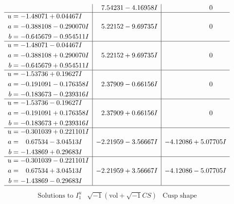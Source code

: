 \documentclass[1p]{elsarticle_modified}
\theoremstyle{definition}
\newcommand{\I}{\sqrt{-1}}
\begin{document}
$$\begin{array}{c|c|c}
 & \phantom{-}7.54231 - 4.16958 I & \phantom{-0.000000 } 0 \\ \hline\begin{aligned}
u &= -1.48071 + 0.04467 I \\
a &= -0.388108 - 0.290070 I \\
b &= -0.645679 - 0.954511 I\end{aligned}
 & \phantom{-}5.22152 - 9.69735 I & \phantom{-0.000000 } 0 \\ \hline\begin{aligned}
u &= -1.48071 - 0.04467 I \\
a &= -0.388108 + 0.290070 I \\
b &= -0.645679 + 0.954511 I\end{aligned}
 & \phantom{-}5.22152 + 9.69735 I & \phantom{-0.000000 } 0 \\ \hline\begin{aligned}
u &= -1.53736 + 0.19627 I \\
a &= -0.191091 - 0.176358 I \\
b &= -0.183673 - 0.239316 I\end{aligned}
 & \phantom{-}2.37909 - 0.66156 I & \phantom{-0.000000 } 0 \\ \hline\begin{aligned}
u &= -1.53736 - 0.19627 I \\
a &= -0.191091 + 0.176358 I \\
b &= -0.183673 + 0.239316 I\end{aligned}
 & \phantom{-}2.37909 + 0.66156 I & \phantom{-0.000000 } 0 \\ \hline\begin{aligned}
u &= -0.301039 + 0.221101 I \\
a &= \phantom{-}0.67534 - 3.04513 I \\
b &= -1.43869 + 0.29683 I\end{aligned}
 & -2.21959 - 3.56667 I & -4.12086 + 5.07705 I \\ \hline\begin{aligned}
u &= -0.301039 - 0.221101 I \\
a &= \phantom{-}0.67534 + 3.04513 I \\
b &= -1.43869 - 0.29683 I\end{aligned}
 & -2.21959 + 3.56667 I & -4.12086 - 5.07705 I\\
 \hline 
 \end{array}$$\newpage$$\begin{array}{c|c|c}  
\text{Solutions to }I^u_{1}& \I (\text{vol} + \sqrt{-1}CS) & \text{Cusp shape}\\

\end{array}$$
\end{document}
